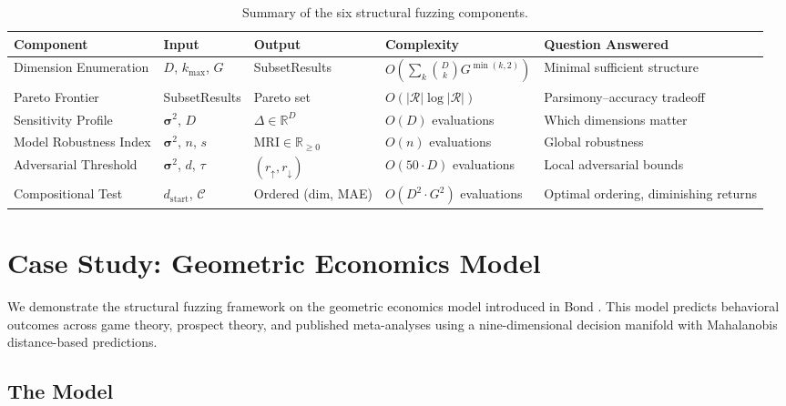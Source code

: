 \documentclass[12pt]{article}
\newcommand{\MRI}{\mathrm{MRI}}
\newcommand{\R}{\mathbb{R}}
\begin{document}
\begin{table}[H]
\centering
\caption{Summary of the six structural fuzzing components.}
\label{tab:algorithm_summary}
\small
\begin{tabular}{@{}llllp{3.0cm}@{}}
\toprule
\textbf{Component} & \textbf{Input} & \textbf{Output} & \textbf{Complexity} & \textbf{Question Answered} \\
\midrule
Dimension Enumeration & $D$, $k_{\max}$, $G$ & SubsetResults & $O\!\left(\sum_k \binom{D}{k} G^{\min(k,2)}\right)$ & Minimal sufficient structure \\[3pt]
Pareto Frontier & SubsetResults & Pareto set & $O(|\mathcal{R}| \log |\mathcal{R}|)$ & Parsimony--accuracy tradeoff \\[3pt]
Sensitivity Profile & $\boldsymbol{\sigma}^2$, $D$ & $\Delta \in \R^D$ & $O(D)$ evaluations & Which dimensions matter \\[3pt]
Model Robustness Index & $\boldsymbol{\sigma}^2$, $n$, $s$ & $\MRI \in \R_{\geq 0}$ & $O(n)$ evaluations & Global robustness \\[3pt]
Adversarial Threshold & $\boldsymbol{\sigma}^2$, $d$, $\tau$ & $(r_{\uparrow}, r_{\downarrow})$ & $O(50 \cdot D)$ evaluations & Local adversarial bounds \\[3pt]
Compositional Test & $d_{\mathrm{start}}$, $\mathcal{C}$ & Ordered (dim, MAE) & $O(D^2 \cdot G^2)$ evaluations & Optimal ordering, diminishing returns \\
\bottomrule
\end{tabular}
\end{table}


\section{Case Study: Geometric Economics Model}
\label{sec:case_study}

We demonstrate the structural fuzzing framework on the geometric economics model introduced in Bond \cite{bond2026geometric,bond2026gecon}.  This model predicts behavioral outcomes across game theory, prospect theory, and published meta-analyses using a nine-dimensional decision manifold with Mahalanobis distance-based predictions.

\subsection{The Model}
\end{document}
